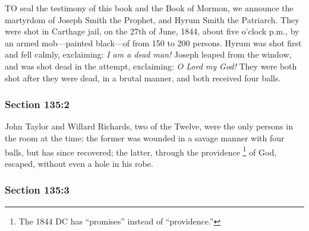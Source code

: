 		TO seal the testimony of this book and the Book of Mormon, we announce the martyrdom of Joseph Smith the Prophet, and Hyrum Smith the Patriarch.  They were shot in Carthage jail, on the 27th of June, 1844, about five o'clock p.m., by an armed mob—painted black—of from 150 to 200 persons.  Hyrum was shot first and fell calmly, exclaiming: \textit{I am a dead man!}  Joseph leaped from the window, and was shot dead in the attempt, exclaiming: \textit{O Lord my God!}  They were both shot after they were dead, in a brutal manner, and both received four balls.


	\subsubsection{Section 135:2} %
		\label{DC135-2}

		John Taylor and Willard Richards, two of the Twelve, were the only persons in the room at the time; the former was wounded in a savage manner with four balls, but has since recovered; the latter, through the providence%
			\footnote{%
				The 1844 DC has ``promises'' instead of ``providence.''
				}
		of God, escaped, without even a hole in his robe.


	\subsubsection{Section 135:3} %
		\label{DC135-3}

